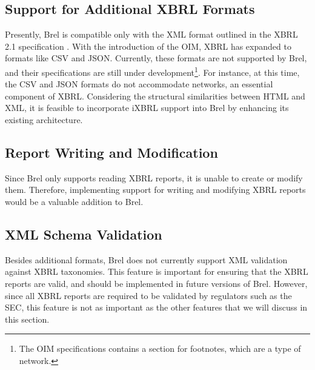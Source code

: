 \subsection{Support for Additional XBRL Formats}

Presently, Brel is compatible only with the XML format outlined in the XBRL 2.1 specification \cite{xbrl21}.
With the introduction of the OIM, XBRL has expanded to 
\textcolor{turkishrose}{formats like CSV and JSON}.
Currently, these formats are not supported by Brel, and their specifications are still under development\footnote{The OIM specifications contains a section for footnotes, which are a type of network.}.
For instance, at this time, the CSV and JSON formats do not accommodate networks, an essential component of XBRL.
Considering the structural similarities between HTML and XML, it is feasible to incorporate iXBRL support into Brel by enhancing its existing architecture.

\subsection{Report Writing and Modification}

Since Brel only supports reading XBRL reports, it is unable to create or modify them.
Therefore, implementing support for 
\textcolor{turkishrose}{writing and modifying XBRL reports} would be a valuable addition to Brel.

\subsection{XML Schema Validation}

Besides additional formats, Brel does not currently support 
\textcolor{turkishrose}{XML validation against XBRL taxonomies}.
This feature is important for ensuring that the XBRL reports are valid, and should be implemented in future versions of Brel.
However, since all XBRL reports are required to be validated by regulators such as the SEC, this feature is not as important as the other features that we will discuss in this section.



